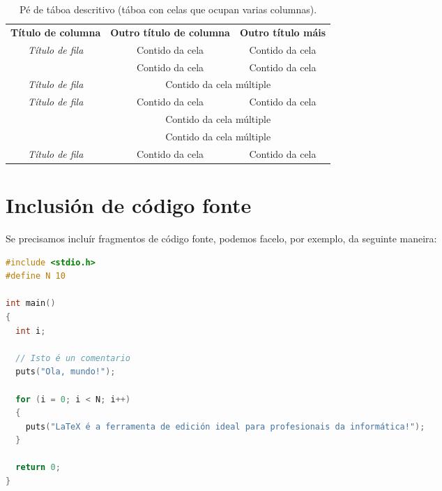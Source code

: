 \begin{table}[hp!]
  \centering
  \begin{tabular}{c|c|c}
  \rowcolor{udcpink!25}
  \multicolumn{3}{c}{\textbf{Cela en varias columnas}} \\\hline
  \rowcolor{udcpink!25}
  \textbf{Título de columna}               & \textbf{Outro título de columna}             & \textbf{Outro título máis} \\\hline
  \multirow{2}{*}{\textit{Título de fila}} & \cellcolor{udcgray!25} Contido da cela       & \cellcolor{udcgray!25} Contido da cela \\
                                           & Contido da cela                              & Contido da cela \\
  \rowcolor{udcgray!25}
  \textit{Título de fila}                  & \multicolumn{2}{c}{Contido da cela múltiple} \\
  \multirow{3}{*}{\textit{Título de fila}} & Contido da cela                              & Contido da cela \\
                                           & \multicolumn{2}{c}{\cellcolor{udcgray!25} Contido da cela múltiple} \\
                                           & \multicolumn{2}{c}{Contido da cela múltiple} \\
  \rowcolor{udcgray!25}
  \textit{Título de fila}                  & Contido da cela                              & Contido da cela \\
  \end{tabular}
  \caption{Pé de táboa descritivo (táboa con celas que ocupan varias columnas).}
  \label{tab:exemplofilasecolumnas}
\end{table}

\section{Inclusión de código fonte}

Se precisamos incluír fragmentos de código fonte, podemos facelo, por exemplo, da
seguinte maneira:

\begin{lstlisting}[language=C]
#include <stdio.h>
#define N 10

int main()
{
  int i;

  // Isto é un comentario
  puts("Ola, mundo!");

  for (i = 0; i < N; i++)
  {
    puts("LaTeX é a ferramenta de edición ideal para profesionais da informática!");
  }

  return 0;
}
\end{lstlisting}

